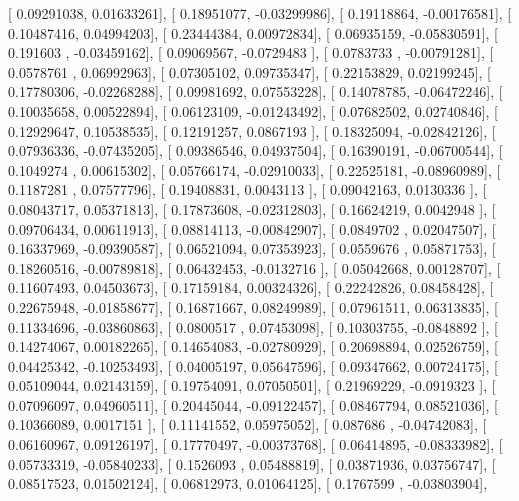 \documentclass{article}
\begin{document}
       [ 0.09291038,  0.01633261],
       [ 0.18951077, -0.03299986],
       [ 0.19118864, -0.00176581],
       [ 0.10487416,  0.04994203],
       [ 0.23444384,  0.00972834],
       [ 0.06935159, -0.05830591],
       [ 0.191603  , -0.03459162],
       [ 0.09069567, -0.0729483 ],
       [ 0.0783733 , -0.00791281],
       [ 0.0578761 ,  0.06992963],
       [ 0.07305102,  0.09735347],
       [ 0.22153829,  0.02199245],
       [ 0.17780306, -0.02268288],
       [ 0.09981692,  0.07553228],
       [ 0.14078785, -0.06472246],
       [ 0.10035658,  0.00522894],
       [ 0.06123109, -0.01243492],
       [ 0.07682502,  0.02740846],
       [ 0.12929647,  0.10538535],
       [ 0.12191257,  0.0867193 ],
       [ 0.18325094, -0.02842126],
       [ 0.07936336, -0.07435205],
       [ 0.09386546,  0.04937504],
       [ 0.16390191, -0.06700544],
       [ 0.1049274 ,  0.00615302],
       [ 0.05766174, -0.02910033],
       [ 0.22525181, -0.08960989],
       [ 0.1187281 ,  0.07577796],
       [ 0.19408831,  0.0043113 ],
       [ 0.09042163,  0.0130336 ],
       [ 0.08043717,  0.05371813],
       [ 0.17873608, -0.02312803],
       [ 0.16624219,  0.0042948 ],
       [ 0.09706434,  0.00611913],
       [ 0.08814113, -0.00842907],
       [ 0.0849702 ,  0.02047507],
       [ 0.16337969, -0.09390587],
       [ 0.06521094,  0.07353923],
       [ 0.0559676 ,  0.05871753],
       [ 0.18260516, -0.00789818],
       [ 0.06432453, -0.0132716 ],
       [ 0.05042668,  0.00128707],
       [ 0.11607493,  0.04503673],
       [ 0.17159184,  0.00324326],
       [ 0.22242826,  0.08458428],
       [ 0.22675948, -0.01858677],
       [ 0.16871667,  0.08249989],
       [ 0.07961511,  0.06313835],
       [ 0.11334696, -0.03860863],
       [ 0.0800517 ,  0.07453098],
       [ 0.10303755, -0.0848892 ],
       [ 0.14274067,  0.00182265],
       [ 0.14654083, -0.02780929],
       [ 0.20698894,  0.02526759],
       [ 0.04425342, -0.10253493],
       [ 0.04005197,  0.05647596],
       [ 0.09347662,  0.00724175],
       [ 0.05109044,  0.02143159],
       [ 0.19754091,  0.07050501],
       [ 0.21969229, -0.0919323 ],
       [ 0.07096097,  0.04960511],
       [ 0.20445044, -0.09122457],
       [ 0.08467794,  0.08521036],
       [ 0.10366089,  0.0017151 ],
       [ 0.11141552,  0.05975052],
       [ 0.087686  , -0.04742083],
       [ 0.06160967,  0.09126197],
       [ 0.17770497, -0.00373768],
       [ 0.06414895, -0.08333982],
       [ 0.05733319, -0.05840233],
       [ 0.1526093 ,  0.05488819],
       [ 0.03871936,  0.03756747],
       [ 0.08517523,  0.01502124],
       [ 0.06812973,  0.01064125],
       [ 0.1767599 , -0.03803904],
\end{document}
